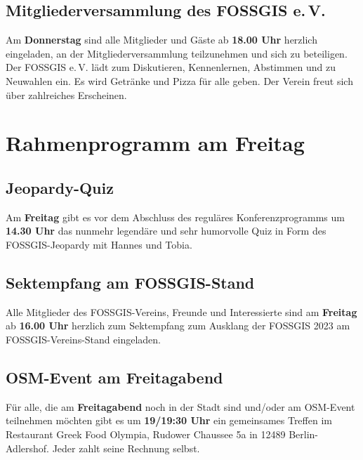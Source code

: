 \subsection*{Mitgliederversammlung des FOSSGIS e.\,V.}
Am {\bfseries Donnerstag} sind alle Mitglieder und Gäste ab {\bfseries 18.00 Uhr} herzlich eingeladen, an der Mitgliederversammlung teilzunehmen und sich zu beteiligen. Der FOSSGIS e.\,V. lädt zum Diskutieren, Kennenlernen, Abstimmen und zu Neuwahlen ein. Es wird Getränke und Pizza für alle geben. Der Verein freut sich über zahlreiches Erscheinen.

\section*{Rahmenprogramm am Freitag}
\subsection*{Jeopardy-Quiz}
Am {\bfseries Freitag} gibt es vor dem Abschluss des reguläres Konferenzprogramms um {\bfseries 14.30 Uhr} das nunmehr legendäre und sehr humorvolle Quiz in Form des FOSSGIS-Jeopardy mit Hannes und Tobia.

\subsection*{Sektempfang am FOSSGIS-Stand}
Alle Mitglieder des FOSSGIS-Vereins, Freunde und Interessierte sind am {\bfseries Freitag} ab {\bfseries 16.00 Uhr} herzlich zum Sektempfang zum Ausklang der FOSSGIS 2023 am FOSSGIS-Vereins-Stand eingeladen.

\subsection*{OSM-Event am Freitagabend}
Für alle, die am {\bfseries Freitagabend} noch in der Stadt sind und/oder am OSM-Event teilnehmen möchten gibt es um {\bfseries 19/19:30 Uhr} ein gemeinsames Treffen im Restaurant Greek Food Olympia, Rudower Chaussee 5a in 12489 Berlin-Adlershof. Jeder zahlt seine Rechnung selbst.

\small
\newpage
\label{platinsposoren}

\newpage

\newpage

\newpage

\newpage

\newpage

\normalsize

